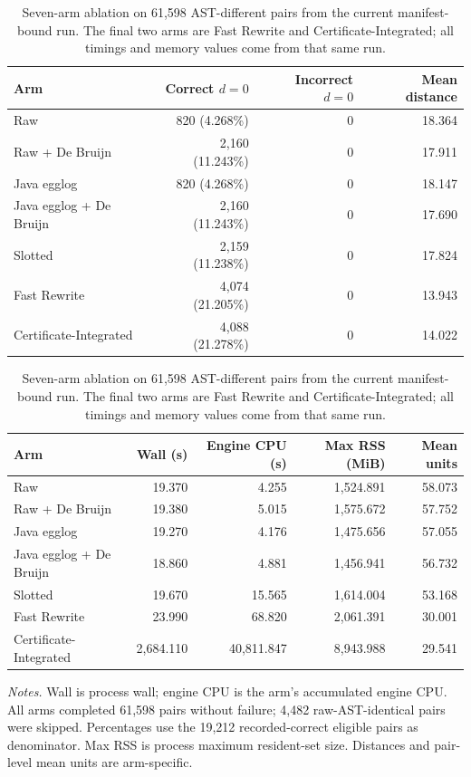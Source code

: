 \begin{table}[H]
\centering
\caption{Seven-arm ablation on 61,598 AST-different pairs from the current
manifest-bound run. The final two arms are Fast Rewrite and
Certificate-Integrated; all timings and memory values come from that same run.}
\label{tab:ablation-natural}
\scriptsize
\setlength{\tabcolsep}{3.2pt}
\begin{tabular}{@{}lrrr@{}}
\toprule
Arm & Correct $d=0$ & Incorrect $d=0$ & Mean distance\\
\midrule
Raw & 820 (4.268\%) & 0 & 18.364\\
Raw + De Bruijn & 2,160 (11.243\%) & 0 & 17.911\\
Java egglog & 820 (4.268\%) & 0 & 18.147\\
Java egglog + De Bruijn & 2,160 (11.243\%) & 0 & 17.690\\
Slotted & 2,159 (11.238\%) & 0 & 17.824\\
Fast Rewrite & 4,074 (21.205\%) & 0 & 13.943\\
Certificate-Integrated & 4,088 (21.278\%) & 0 & 14.022\\
\bottomrule
\end{tabular}

\medskip
\setlength{\tabcolsep}{2.8pt}
\begin{tabular}{@{}lrrrr@{}}
\toprule
Arm & Wall (s) & Engine CPU (s) & Max RSS (MiB) & Mean units\\
\midrule
Raw & 19.370 & 4.255 & 1,524.891 & 58.073\\
Raw + De Bruijn & 19.380 & 5.015 & 1,575.672 & 57.752\\
Java egglog & 19.270 & 4.176 & 1,475.656 & 57.055\\
Java egglog + De Bruijn & 18.860 & 4.881 & 1,456.941 & 56.732\\
Slotted & 19.670 & 15.565 & 1,614.004 & 53.168\\
Fast Rewrite & 23.990 & 68.820 & 2,061.391 & 30.001\\
Certificate-Integrated & 2,684.110 & 40,811.847 & 8,943.988 & 29.541\\
\bottomrule
\end{tabular}

\parbox{0.97\linewidth}{\footnotesize\emph{Notes.} Wall is process wall;
engine CPU is the arm's accumulated engine CPU. All arms completed
61,598 pairs without failure; 4,482 raw-AST-identical pairs were skipped.
Percentages use the 19,212 recorded-correct eligible pairs as denominator.
Max RSS is process maximum resident-set size. Distances and pair-level mean
units are arm-specific.}
\end{table}

